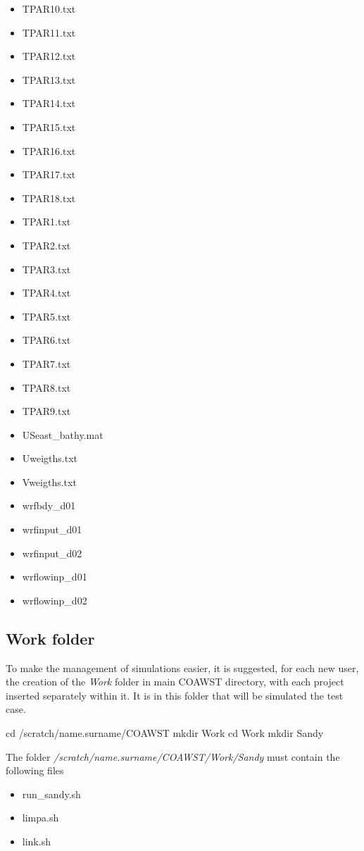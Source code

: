 \begin{itemize}
\item TPAR10.txt
\item TPAR11.txt
\item TPAR12.txt
\item TPAR13.txt
\item TPAR14.txt
\item TPAR15.txt
\item TPAR16.txt
\item TPAR17.txt
\item TPAR18.txt
\item TPAR1.txt
\item TPAR2.txt
\item TPAR3.txt
\item TPAR4.txt
\item TPAR5.txt
\item TPAR6.txt
\item TPAR7.txt
\item TPAR8.txt
\item TPAR9.txt
\item USeast\_bathy.mat
\item Uweigths.txt
\item Vweigths.txt
\item wrfbdy\_d01
\item wrfinput\_d01
\item wrfinput\_d02
\item wrflowinp\_d01
\item wrflowinp\_d02
\end{itemize}
\bigskip

\subsection{Work folder}\label{workcoawstsec}
\bigskip

\noindent To make the management of simulations easier, it is suggested, for each new user, the creation of the \textit{Work} folder in
main COAWST directory, with each project inserted separately within it. It is in this folder that will be simulated
the test case.
\bigskip

\begin{bashcode}
cd /scratch/name.surname/COAWST
mkdir Work
cd Work
mkdir Sandy
\end{bashcode}
\bigskip

\noindent The folder \textit{/scratch/name.surname/COAWST/Work/Sandy} must contain the following files
\bigskip

\begin{itemize}
\item run\_sandy.sh
\item limpa.sh
\item link.sh
\end{itemize}
\bigskip

